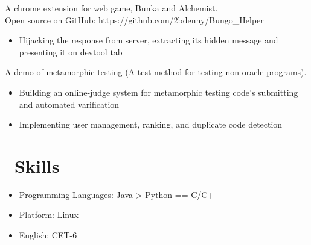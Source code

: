 \documentclass{resume}
\begin{document}
A chrome extension for web game, Bunka and Alchemist. \\
Open source on GitHub: https://github.com/2bdenny/Bungo\_Helper
\begin{itemize}
  \item Hijacking the response from server, extracting its hidden message and presenting it on devtool tab
\end{itemize}

A demo of metamorphic testing (A test method for testing non-oracle programs).
\begin{itemize}
  \item Building an online-judge system for metamorphic testing code's submitting and automated varification
  \item Implementing user management, ranking, and duplicate code detection
\end{itemize}


\section{\faCogs\ Skills}
\begin{itemize}[parsep=0.5ex]
  \item Programming Languages: Java > Python == C/C++
  \item Platform: Linux
  \item English: CET-6
\end{itemize}



\end{document}
